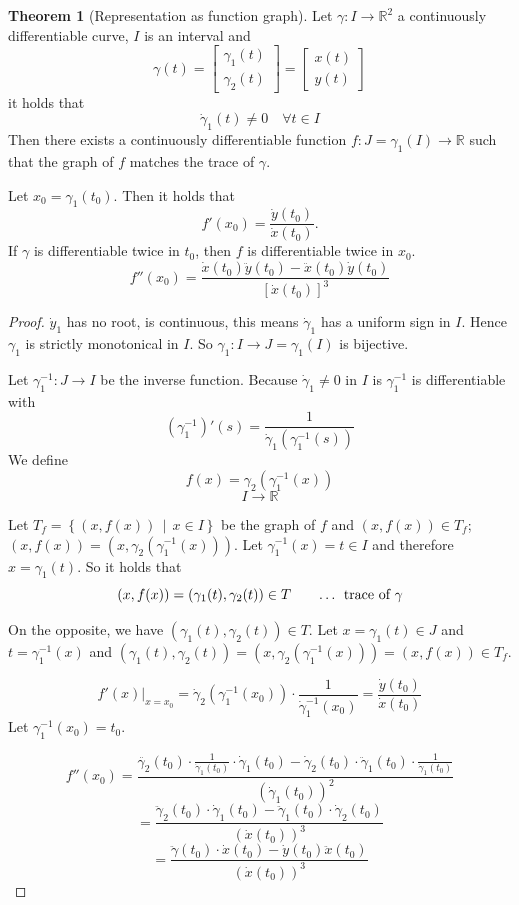 \documentclass[a4paper,landscape,twocolumn]{article}
\theoremstyle{definition}
\newtheorem{theorem}{Theorem}
\newcommand\setdef[2]{\left\{#1\,\middle|\,#2\right\}}
\begin{document}
\begin{theorem}[Representation as function graph]
  Let $\gamma: I \to \mathbb R^2$ a continuously differentiable curve,
  $I$ is an interval and
  \[
    \gamma(t) = \begin{bmatrix} \gamma_1(t) \\ \gamma_2(t) \end{bmatrix}
    = \begin{bmatrix} x(t) \\ y(t) \end{bmatrix}
  \]
  it holds that
  \[ \dot{\gamma}_1(t) \neq 0 \quad \forall t \in I \]
  Then there exists a continuously differentiable function
  $f: J = \gamma_1(I) \to \mathbb R$ such that the graph of $f$
  matches the trace of $\gamma$.

  Let $x_0 = \gamma_1(t_0)$. Then it holds that
  \[ f'(x_0) = \frac{\dot{y}(t_0)}{\dot{x}(t_0)}. \]
  If $\gamma$ is differentiable twice in $t_0$,
  then $f$ is differentiable twice in $x_0$.
  \[ f''(x_0) = \frac{\dot{x}(t_0) \ddot{y}(t_0) - \ddot{x}(t_0) \dot{y}(t_0)}{[\dot{x}(t_0)]^3} \]
\end{theorem}
\begin{proof}
  $\dot{y}_1$ has no root, is continuous,
  this means $\dot{\gamma}_1$ has a uniform sign in $I$.
  Hence $\gamma_1$ is strictly monotonical in $I$.
  So $\gamma_1: I \to J = \gamma_1(I)$ is bijective.

  Let $\gamma_1^{-1}: J \to I$ be the inverse function.
  Because $\dot{\gamma}_1 \neq 0$ in $I$ is $\gamma_1^{-1}$ is differentiable
  with
  \[ \left(\gamma_1^{-1}\right)'(s) = \frac{1}{\dot{\gamma}_1(\gamma_1^{-1}(s))} \]
  We define \[ f(x) = \gamma_2(\gamma_1^{-1}(x)) \]
  \[ I \to \mathbb R \]

  Let $T_f = \setdef{(x, f(x))}{x \in I}$ be the graph of $f$ and $(x, f(x)) \in T_f$;
  $(x, f(x)) = (x, \gamma_2(\gamma_1^{-1}(x)))$.
  Let $\gamma_1^{-1}(x) = t \in I$ and therefore $x = \gamma_1(t)$. So it holds that
  \[ (x, f(x)) = (\gamma_1(t), \gamma_2(t)) \in T \qquad \text{\dots{} trace of } \gamma \]

  On the opposite, we have $(\gamma_1(t), \gamma_2(t)) \in T$.
  Let $x = \gamma_1(t) \in J$ and $t = \gamma_1^{-1}(x)$ and $(\gamma_1(t), \gamma_2(t)) = (x, \gamma_2(\gamma_1^{-1}(x))) = (x, f(x)) \in T_f$.

  \[ \left.f'(x)\right|_{x = x_0} = \dot{\gamma}_2(\gamma_1^{-1}(x_0)) \cdot \frac{1}{\dot{\gamma}_1^{-1}(x_0)} = \frac{\dot{y}(t_0)}{\dot{x}(t_0)} \]
  Let $\gamma_1^{-1}(x_0) = t_0$.

  \[
    f''(x_0) = \frac{\ddot{\gamma_2}(t_0) \cdot \frac{1}{\dot{\gamma}_1(t_0)} \cdot \dot{\gamma}_1(t_0) - \dot{\gamma}_2(t_0) \cdot \ddot{\gamma}_1(t_0) \cdot \frac{1}{\dot{\gamma}_1(t_0)}}{(\dot{\gamma}_1(t_0))^2}
  \] \[
    = \frac{\ddot{\gamma}_2(t_0) \cdot \dot{\gamma}_1(t_0) - \ddot{\gamma}_1(t_0) \cdot \dot{\gamma}_2(t_0)}{(\dot{x}(t_0))^3}
  \]
  \[ = \frac{\ddot{\gamma}(t_0) \cdot \dot{x}(t_0) - \dot{y}(t_0) \ddot{x}(t_0)}{(\dot{x}(t_0))^3} \]
\end{proof}
\end{document}
